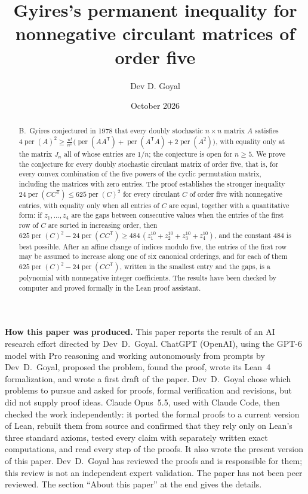 \documentclass[11pt,a4paper]{article}
\title{Gyires's permanent inequality for nonnegative circulant matrices of order five}
\author{Dev D. Goyal}
\date{October 2026}
\theoremstyle{definition}
\theoremstyle{remark}
\newcommand{\per}{\operatorname{per}}
\newcommand{\T}{\mathsf{T}}
\begin{document}
\maketitle
\begin{abstract}
B.~Gyires conjectured in 1978 that every doubly stochastic $n\times n$ matrix $A$ satisfies
$4\per(A)^2\ge\frac{n!}{n^n}\bigl(\per(AA^\T)+\per(A^\T A)+2\per(A^2)\bigr)$, with equality only at the matrix
$J_n$ all of whose entries are $1/n$; the conjecture is open for $n\ge5$. We prove the conjecture for every doubly
stochastic circulant matrix of order five, that is, for every convex combination of the five powers of the cyclic
permutation matrix, including the matrices with zero entries. The proof establishes the stronger inequality
$24\per(CC^\T)\le625\per(C)^2$ for every circulant $C$ of order five with nonnegative entries, with equality only when
all entries of $C$ are equal, together with a quantitative form: if $z_1,\dots,z_4$ are the gaps between consecutive
values when the entries of the first row of $C$ are sorted in increasing order, then
$625\per(C)^2-24\per(CC^\T)\ge484\,(z_1^{10}+z_2^{10}+z_3^{10}+z_4^{10})$, and the constant $484$ is best possible.
After an affine change of indices modulo five, the entries of the first row may be assumed to increase along one of six
canonical orderings, and for each of them $625\per(C)^2-24\per(CC^\T)$, written in the smallest entry and the gaps, is
a polynomial with nonnegative integer coefficients. The results have been checked by computer and proved formally in
the Lean proof assistant.
\end{abstract}
\begin{center}\begin{minipage}{0.88\linewidth}\small
\textbf{How this paper was produced.} This paper reports the result of an AI research effort directed by
Dev~D.~Goyal. ChatGPT (OpenAI), using the GPT-6 model with Pro reasoning and working autonomously from prompts by
Dev~D.~Goyal, proposed the problem, found the proof, wrote its Lean~4 formalization, and wrote a first draft of the paper.
Dev~D.~Goyal chose which problems to pursue and asked for proofs, formal verification and revisions, but did not supply
proof ideas. Claude Opus~5.5, used with Claude Code, then checked the work independently: it ported the formal proofs to
a current version of Lean, rebuilt them from source and confirmed that they rely only on Lean's three standard axioms,
tested every claim with separately written exact computations, and read every step of the proofs. It also wrote the
present version of this paper. Dev~D.~Goyal has reviewed the proofs and is responsible for them; this review is not an
independent expert validation. The paper has not been peer reviewed. The section ``About this paper'' at the end gives
the details.
\end{minipage}\end{center}
\end{document}
